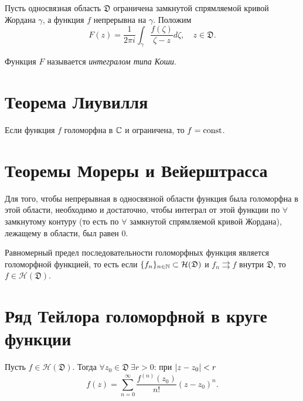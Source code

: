 \begin{definition}
	Пусть односвязная область $\mathfrak{D}$ ограничена замкнутой спрямляемой кривой Жордана $\gamma$, а функция $f$ непрерывна на $\gamma$. Положим
	\[
		F(z) = \frac{1}{2\pi i}\int_{\gamma}\frac{f(\zeta)}{\zeta - z}d \zeta, \quad z \in \mathfrak{D}.
	\]

	Функция $F$ называется \emph{интегралом типа Коши}.
\end{definition}

\section{Теорема Лиувилля}

\begin{theorem}
	Если функция $f$ голоморфна в $\mathbb{C}$ и ограничена, то $f = \operatorname{const}$.
\end{theorem}

\section{Теоремы Мореры и Вейерштрасса}

\begin{theorem}[Морера]
	Для того, чтобы непрерывная в односвязной области функция была голоморфна в этой области, необходимо и достаточно, чтобы интеграл от этой функции по $\forall $ замкнутому контуру (то есть по $\forall $ замкнутой спрямляемой кривой Жордана), лежащему в области, был равен $0$.
\end{theorem}

\begin{theorem}[Вейерштрасса]
	Равномерный предел последовательности голоморфных функция является голоморфной функцией, то есть если $\{f_n\}_{n \in \mathbb{N}}\subset \mathcal{H}(\mathfrak{D})$ и $f_n \rightrightarrows f$ внутри $\mathfrak{D}$, то $f \in \mathcal{H}(\mathfrak{D})$.
\end{theorem}

\section{Ряд Тейлора голоморфной в круге функции}

\begin{theorem}
	Пусть $f \in \mathcal{H}(\mathfrak{D})$. Тогда $\forall z_0 \in \mathfrak{D} \ \exists r > 0$: при $\left\lvert z-z_0\right\rvert < r$
	\[
		f(z) = \sum_{n=0}^{\infty}\frac{f^{(n)}(z_0)}{n!}(z-z_0)^n.
	\]
\end{theorem}

